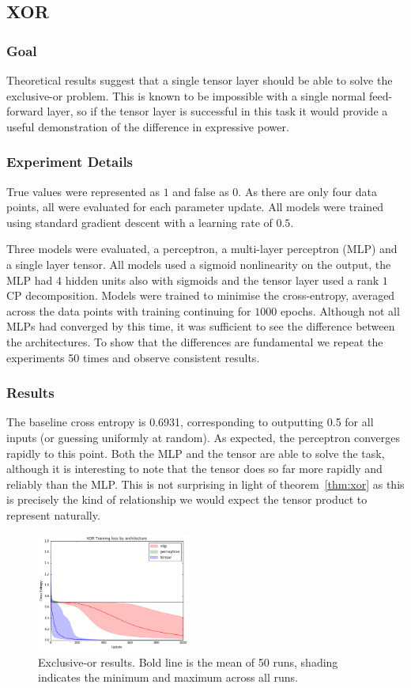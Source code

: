 \subsection{XOR}
\subsubsection{Goal}
Theoretical results suggest that a single tensor layer should be able to solve the exclusive-or problem.
This is known to be impossible with a single normal feed-forward layer, so if the tensor layer is successful
in this task it would provide a useful demonstration of the difference in expressive power.

\subsubsection{Experiment Details}
True values were represented
as \(1\) and false as \(0\). As there are only four data points, all were evaluated for each parameter update.
All models were trained using standard gradient descent with a learning rate of \(0.5\).

Three models were evaluated, a perceptron, a multi-layer perceptron (MLP) and a single layer tensor. All
models used a sigmoid nonlinearity on the output, the MLP had 4 hidden units also with sigmoids and the 
tensor layer used a rank \(1\) CP decomposition. Models
were trained to minimise the cross-entropy, averaged across the data points with training continuing
for \(1000\) epochs. Although not all MLPs had converged by this time, it was sufficient to see the difference
between the architectures. To show that the differences are fundamental we repeat the experiments 50
times and observe consistent results.

\subsubsection{Results}
The baseline cross entropy is 0.6931, corresponding to outputting
0.5 for all inputs (or guessing uniformly at random). As expected, the perceptron converges rapidly to this
point. Both the MLP and the tensor are able to solve the task, although it is interesting to note that the
tensor does so far more rapidly and reliably than the MLP. This is not surprising in light of
theorem~\ref{thm:xor} as this is precisely the kind of relationship we would expect the tensor product to
represent naturally.

\begin{figure}
\centering
\includegraphics[width=0.45\textwidth]{tensors/xor}
 \caption[XOR results]{Exclusive-or results. Bold line is the mean of 50 runs, shading indicates the
minimum and maximum across all runs.}
\end{figure}

